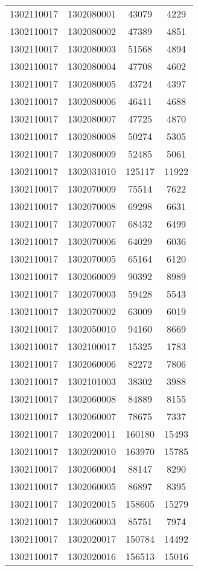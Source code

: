 \begin{longtable}{llcc}
1302110017 & 1302080001 & 43079 & 4229\\
1302110017 & 1302080002 & 47389 & 4851\\
1302110017 & 1302080003 & 51568 & 4894\\
1302110017 & 1302080004 & 47708 & 4602\\
1302110017 & 1302080005 & 43724 & 4397\\
1302110017 & 1302080006 & 46411 & 4688\\
1302110017 & 1302080007 & 47725 & 4870\\
1302110017 & 1302080008 & 50274 & 5305\\
1302110017 & 1302080009 & 52485 & 5061\\
1302110017 & 1302031010 & 125117 & 11922\\
1302110017 & 1302070009 & 75514 & 7622\\
1302110017 & 1302070008 & 69298 & 6631\\
1302110017 & 1302070007 & 68432 & 6499\\
1302110017 & 1302070006 & 64029 & 6036\\
1302110017 & 1302070005 & 65164 & 6120\\
1302110017 & 1302060009 & 90392 & 8989\\
1302110017 & 1302070003 & 59428 & 5543\\
1302110017 & 1302070002 & 63009 & 6019\\
1302110017 & 1302050010 & 94160 & 8669\\
1302110017 & 1302100017 & 15325 & 1783\\
1302110017 & 1302060006 & 82272 & 7806\\
1302110017 & 1302101003 & 38302 & 3988\\
1302110017 & 1302060008 & 84889 & 8155\\
1302110017 & 1302060007 & 78675 & 7337\\
1302110017 & 1302020011 & 160180 & 15493\\
1302110017 & 1302020010 & 163970 & 15785\\
1302110017 & 1302060004 & 88147 & 8290\\
1302110017 & 1302060005 & 86897 & 8395\\
1302110017 & 1302020015 & 158605 & 15279\\
1302110017 & 1302060003 & 85751 & 7974\\
1302110017 & 1302020017 & 150784 & 14492\\
1302110017 & 1302020016 & 156513 & 15016\\

\end{longtable}
